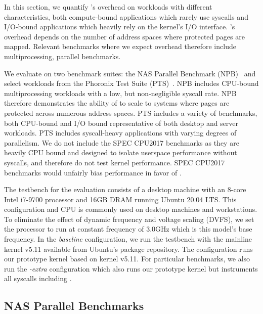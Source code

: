\documentclass[letterpaper,twocolumn,10pt, anonymous]{article}
\begin{document}
In this section, we quantify \tiktok's overhead on workloads 
with different characteristics, both compute-bound applications
which rarely use syscalls and I/O-bound applications which 
heavily rely on the kernel's I/O interface.
\tiktok's overhead depends on the number of address spaces 
where protected pages are mapped. 
Relevant benchmarks where we expect overhead therefore include multiprocessing,
parallel benchmarks.

We evaluate \tiktok on two benchmark suites: the NAS Parallel 
Benchmark (NPB)~\cite{npb} and select workloads from the 
Phoronix Test Suite (PTS)~\cite{pts}. 
NPB includes CPU-bound multiprocessing workloads with a 
low, but non-negligible syscall rate. 
NPB therefore demonstrates the ability of \tiktok to 
scale to systems where pages are protected across numerous 
address spaces.
PTS includes a variety of benchmarks, both CPU-bound and 
I/O bound representative of both desktop and server workloads.
PTS includes syscall-heavy applications with varying degrees 
of parallelism.
We do not include the SPEC CPU2017 benchmarks
as they are heavily CPU bound and designed to isolate userspace 
performance without syscalls, and therefore do not test kernel 
performance. SPEC CPU2017 benchmarks would unfairly bias performance in favor of
\tiktok.

The testbench for the evaluation consists of a desktop machine 
with an 8-core Intel i7-9700 processor and 16GB DRAM running 
Ubuntu 20.04 LTS. This configuration and CPU is commonly used on desktop
machines and workstations.
%
To eliminate the effect of dynamic frequency and voltage 
scaling (DVFS), we set the processor to run at constant 
frequency of 3.0GHz which is this model's base frequency.
In the \emph{baseline} configuration, we run the testbench 
with the mainline kernel v5.11 available from Ubuntu's package 
repository.
The \emph{\tiktok} configuration runs our prototype \tiktok kernel 
based on kernel v5.11.
For particular benchmarks, we also run the \emph{\tiktok-extra}
configuration which also runs our prototype \tiktok kernel
but instruments all syscalls including .


\subsection{NAS Parallel Benchmarks}
\end{document}
